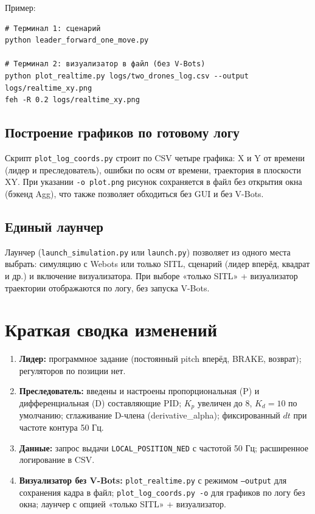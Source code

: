 \documentclass[12pt,a4paper]{article}
\begin{document}
Пример:
\begin{verbatim}
# Терминал 1: сценарий
python leader_forward_one_move.py

# Терминал 2: визуализатор в файл (без V-Bots)
python plot_realtime.py logs/two_drones_log.csv --output logs/realtime_xy.png
feh -R 0.2 logs/realtime_xy.png
\end{verbatim}

\subsection{Построение графиков по готовому логу}

Скрипт \texttt{plot\_log\_coords.py} строит по CSV четыре графика: X и Y от времени (лидер и преследователь), ошибки по осям от времени, траектория в плоскости XY. При указании \texttt{-o plot.png} рисунок сохраняется в файл без открытия окна (бэкенд Agg), что также позволяет обходиться без GUI и без V-Bots.

\subsection{Единый лаунчер}

Лаунчер (\texttt{launch\_simulation.py} или \texttt{launch.py}) позволяет из одного места выбрать: симуляцию с Webots или только SITL, сценарий (лидер вперёд, квадрат и др.) и включение визуализатора. При выборе «только SITL» + визуализатор траектории отображаются по логу, без запуска V-Bots.

\section{Краткая сводка изменений}

\begin{enumerate}
  \item \textbf{Лидер:} программное задание (постоянный pitch вперёд, BRAKE, возврат); регуляторов по позиции нет.
  \item \textbf{Преследователь:} введены и настроены пропорциональная (P) и дифференциальная (D) составляющие PID; $K_p$ увеличен до 8, $K_d = 10$ по умолчанию; сглаживание D-члена (derivative\_alpha); фиксированный $dt$ при частоте контура 50 Гц.
  \item \textbf{Данные:} запрос выдачи \texttt{LOCAL\_POSITION\_NED} с частотой 50 Гц; расширенное логирование в CSV.
  \item \textbf{Визуализатор без V-Bots:} \texttt{plot\_realtime.py} с режимом \texttt{--output} для сохранения кадра в файл; \texttt{plot\_log\_coords.py -o} для графиков по логу без окна; лаунчер с опцией «только SITL» + визуализатор.
\end{enumerate}
\end{document}

